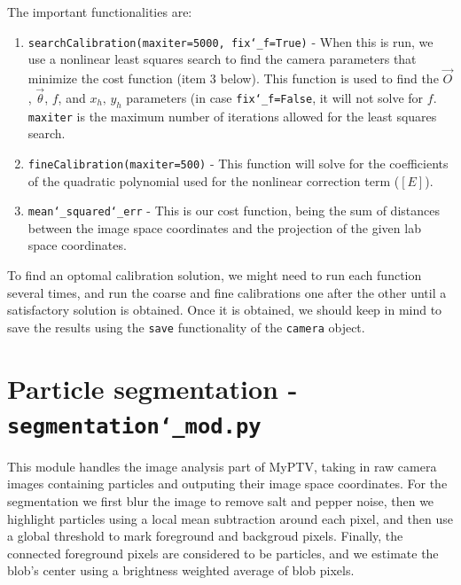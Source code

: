 \documentclass[10pt,a4paper]{article}
\begin{document}
The important functionalities are:
%
\begin{enumerate}
	
	\item \texttt{searchCalibration(maxiter=5000, fix\char`_f=True)} - When this is run, we use a nonlinear least squares search to find the camera parameters that minimize the cost function (item 3 below). This function is used to find the $\vec{O}$, $\vec{\theta}$, $f$, and $x_h, \, y_h$ parameters (in case \texttt{fix\char`_f=False}, it will not solve for $f$. \texttt{maxiter} is the maximum number of iterations allowed for the least squares search.
	
	\item \texttt{fineCalibration(maxiter=500)} - This function will solve for the coefficients of the quadratic polynomial used for the nonlinear correction term ($[E]$). 
	
	\item \texttt{mean\char`_squared\char`_err} - This is our cost function, being the sum of distances between the image space coordinates and the projection of the given lab space coordinates.
	
\end{enumerate}
%
To find an optomal calibration solution, we might need to run each function several times, and run the coarse and fine calibrations one after the other until a satisfactory solution is obtained. Once it is obtained, we should keep in mind to save the results using the \texttt{save} functionality of the \texttt{camera} object. 








\section{Particle segmentation - \texttt{segmentation\char`_mod.py}} 


This module handles the image analysis part of MyPTV, taking in raw camera images containing particles and outputing their image space coordinates. For the segmentation we first blur the image to remove salt and pepper noise, then we highlight particles using a local mean subtraction around each pixel, and then use a global threshold to mark foreground and backgroud pixels. Finally, the connected foreground pixels are considered to be particles, and we estimate the blob's center using a brightness weighted average of blob pixels.
\end{document}

